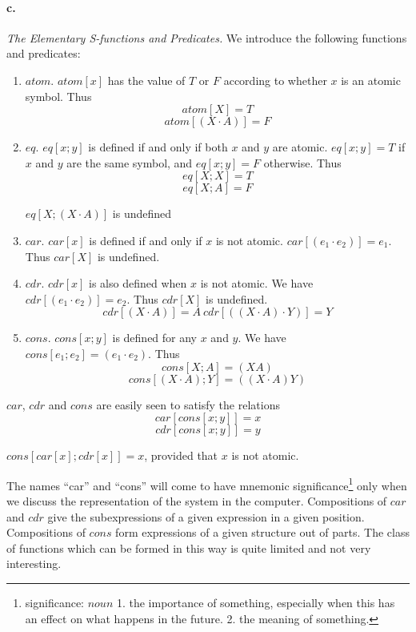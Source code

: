 \documentclass[11pt, a4paper]{article}
\begin{document}
\paragraph{c.}\textit{The Elementary S-functions and Predicates.}
We introduce the following functions and predicates:
\begin{enumerate}
\item $atom$. $atom[x]$ has the value of $T$ or $F$ according to whether $x$ is
  an atomic symbol. Thus
  $$ atom[X] = T $$
  $$ atom[(X \cdot A)] = F $$
\item $eq$. $eq[x; y]$ is defined if and only if both $x$ and $y$ are
  atomic. $eq[x; y] = T$ if $x$ and $y$ are the same symbol, and $eq[x; y] = F$
  otherwise. Thus
  $$ eq[X; X] = T $$
  $$ eq[X; A] = F $$
  \begin{center}$eq[X; (X \cdot A)]$ is undefined\end{center}
\item $car$. $car[x]$ is defined if and only if $x$ is not atomic. $car[(e_1
  \cdot e_2)] = e_1$. Thus $car[X]$ is undefined.
\item $cdr$. $cdr[x]$ is also defined when $x$ is not atomic. We have $cdr[(e_1
  \cdot e_2)] = e_2$. Thus $cdr[X]$ is undefined.
  $$ cdr[(X \cdot A)] = A \ cdr[((X \cdot A) \cdot Y)] = Y $$
\item $cons$. $cons[x; y]$ is defined for any $x$ and $y$. We have $cons[e_1;
  e_2] = (e_1 \cdot e_2)$. Thus
  $$ cons[X; A] = (X A) $$
  $$ cons[(X \cdot A); Y] = ((X \cdot A) Y) $$
\end{enumerate}
$car$, $cdr$ and $cons$ are easily seen to satisfy the relations
$$ car[cons[x; y]] = x $$
$$ cdr[cons[x; y]] = y $$
\begin{center}$cons[car[x]; cdr[x]] = x$, provided that $x$ is not
  atomic.\end{center}

The names ``car'' and ``cons'' will come to have mnemonic
significance\footnote{significance: $noun$ 1. the importance of something,
  especially when this has an effect on what happens in the future. 2. the
  meaning of something.}
only when
we discuss the representation of the system in the computer. Compositions of
$car$ and $cdr$ give the subexpressions of a given expression in a given
position. Compositions of $cons$ form expressions of a given structure out of
parts. The class of functions which can be formed in this way is quite limited
and not very interesting.
\end{document}
